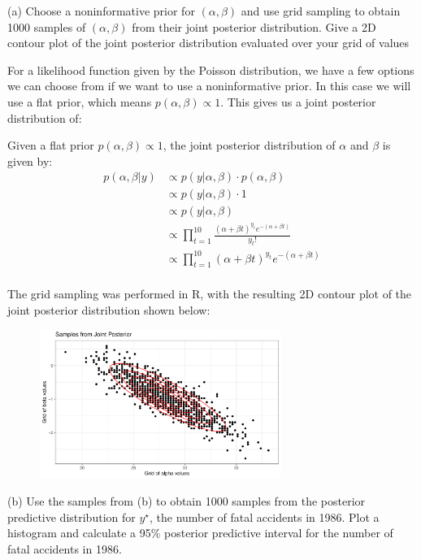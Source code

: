 \documentclass[12pt]{article}
\begin{document}
(a) Choose a noninformative prior for $(\alpha, \beta)$ and use grid sampling to obtain 1000 samples of $(\alpha, \beta)$ from their joint posterior distribution.  Give a 2D contour plot of the joint posterior distribution evaluated over your grid of values

For a likelihood function given by the Poisson distribution, we have a few options we can choose from if we want
to use a noninformative prior. In this case we will use a flat prior, which means $p(\alpha, \beta) \propto 1$.
This gives us a joint posterior distribution of:

Given a flat prior $p(\alpha, \beta) \propto 1$, the joint posterior distribution of $\alpha$ and $\beta$ is given by:
\begin{align*}
p(\alpha, \beta | y) &\propto p(y | \alpha, \beta) \cdot p(\alpha, \beta) \\
&\propto p(y | \alpha, \beta) \cdot 1 \\
&\propto p(y | \alpha, \beta) \\
&\propto \prod_{t=1}^{10} \frac{(\alpha + \beta t)^{y_t}e^{-(\alpha + \beta t)}}{y_t!} \\
&\propto \prod_{t=1}^{10} (\alpha + \beta t)^{y_t}e^{-(\alpha + \beta t)} \\
\end{align*}

The grid sampling was performed in R, with the resulting 2D contour plot of the joint posterior distribution shown below:

\begin{figure}[h]
    \centering
    \includegraphics[width=0.7\textwidth]{q6a_plot.pdf}
\end{figure}

(b) Use the samples from (b) to obtain 1000 samples from the posterior predictive distribution for $y^\star$,
the number of fatal accidents in 1986.  Plot a histogram and calculate a 95\% posterior predictive interval
for the number of fatal accidents in 1986. 
\end{document}
